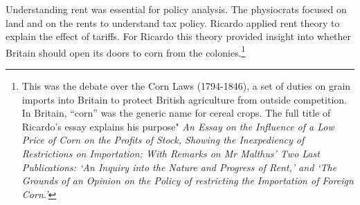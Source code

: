 Understanding rent was essential for policy analysis. The physiocrats focused on land and on the rents to understand tax policy. Ricardo applied rent theory to explain the effect of tariffs. For Ricardo this theory provided insight into whether Britain should open its doors to corn from the colonies.\footnote{ This was the debate over the Corn Laws (1794-1846), a set of duties on grain imports into Britain to protect British agriculture from outside competition. In Britain, ``corn'' was the generic name for cereal crops. The full title of Ricardo's essay explains his purpose" \textit{An Essay on the Influence of a Low Price of Corn on the Profits of Stock, Showing the Inexpediency of Restrictions on Importation: With Remarks on Mr Malthus' Two Last Publications: `An Inquiry into the Nature and Progress of Rent,' and `The Grounds of an Opinion on the Policy of restricting the Importation of Foreign Corn.'} }




